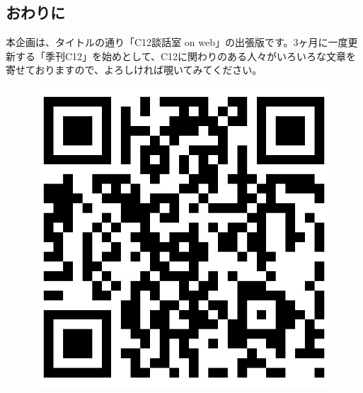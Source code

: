 \subsection{おわりに}
\noindent
本企画は、タイトルの通り「C12談話室 on web」の出張版です。3ヶ月に一度更新する「季刊C12」を始めとして、C12に関わりのある人々がいろいろな文章を寄せておりますので、よろしければ覗いてみてください。\\

\begin{figure}[ht]
\includegraphics[scale=0.1, bb=0 0 500 500]{2025shinki/c12_danwa_one_day/kumanoc12com.jpg}
\end{figure}

